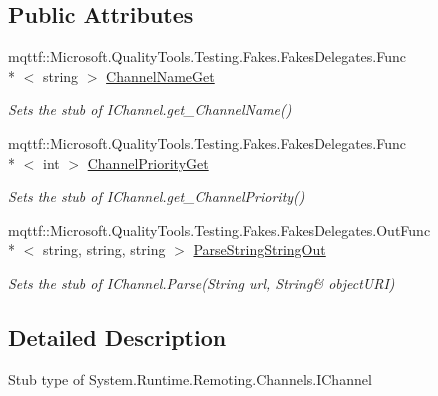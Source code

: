 \subsection*{Public Attributes}
\begin{DoxyCompactItemize}
\item 
mqttf\-::\-Microsoft.\-Quality\-Tools.\-Testing.\-Fakes.\-Fakes\-Delegates.\-Func\\*
$<$ string $>$ \hyperlink{class_system_1_1_runtime_1_1_remoting_1_1_channels_1_1_fakes_1_1_stub_i_channel_aa04d2b8fc883e76e5419583c8e333fd9}{Channel\-Name\-Get}
\begin{DoxyCompactList}\small\item\em Sets the stub of I\-Channel.\-get\-\_\-\-Channel\-Name()\end{DoxyCompactList}\item 
mqttf\-::\-Microsoft.\-Quality\-Tools.\-Testing.\-Fakes.\-Fakes\-Delegates.\-Func\\*
$<$ int $>$ \hyperlink{class_system_1_1_runtime_1_1_remoting_1_1_channels_1_1_fakes_1_1_stub_i_channel_a3d09e8088a886e82a9e36b8b01f8d61f}{Channel\-Priority\-Get}
\begin{DoxyCompactList}\small\item\em Sets the stub of I\-Channel.\-get\-\_\-\-Channel\-Priority()\end{DoxyCompactList}\item 
mqttf\-::\-Microsoft.\-Quality\-Tools.\-Testing.\-Fakes.\-Fakes\-Delegates.\-Out\-Func\\*
$<$ string, string, string $>$ \hyperlink{class_system_1_1_runtime_1_1_remoting_1_1_channels_1_1_fakes_1_1_stub_i_channel_acc7b72663718e34414573afd8e38df87}{Parse\-String\-String\-Out}
\begin{DoxyCompactList}\small\item\em Sets the stub of I\-Channel.\-Parse(String url, String\& object\-U\-R\-I)\end{DoxyCompactList}\end{DoxyCompactItemize}


\subsection{Detailed Description}
Stub type of System.\-Runtime.\-Remoting.\-Channels.\-I\-Channel



